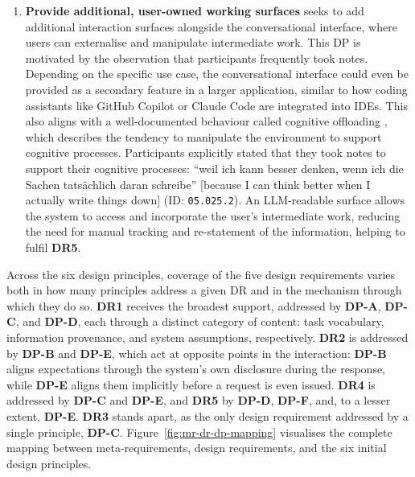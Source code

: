 \begin{enumerate}[label=\textbf{DP-\Alph*}, leftmargin=*]
    \item \textbf{Provide additional, user-owned working surfaces} seeks to add additional interaction surfaces alongside the conversational interface, where users can externalise and manipulate intermediate work. This \ac{DP} is motivated by the observation that participants frequently took notes. Depending on the specific use case, the conversational interface could even be provided as a secondary feature in a larger application, similar to how coding assistants like GitHub Copilot \parencite{GitHubInc2026} or Claude Code \parencite{AnthropicInc2026} are integrated into IDEs. This also aligns with a well-documented behaviour called cognitive offloading \parencite{Risko2016}, which describes the tendency to manipulate the environment to support cognitive processes. Participants explicitly stated that they took notes to support their cognitive processes: \enquote{weil ich kann besser denken, wenn ich die Sachen tatsächlich daran schreibe} [because I can think better when I actually write things down] (ID: \texttt{05.025.2}). An \ac{LLM}-readable surface allows the system to access and incorporate the user's intermediate work, reducing the need for manual tracking and re-statement of the information, helping to fulfil \textbf{DR5}.
\end{enumerate}

Across the six design principles, coverage of the five design requirements varies both in how many principles address a given \ac{DR} and in the mechanism through which they do so. \textbf{DR1} receives the broadest support, addressed by \textbf{DP-A}, \textbf{DP-C}, and \textbf{DP-D}, each through a distinct category of content: task vocabulary, information provenance, and system assumptions, respectively. \textbf{DR2} is addressed by \textbf{DP-B} and \textbf{DP-E}, which act at opposite points in the interaction: \textbf{DP-B} aligns expectations through the system's own disclosure during the response, while \textbf{DP-E} aligns them implicitly before a request is even issued. \textbf{DR4} is addressed by \textbf{DP-C} and \textbf{DP-E}, and \textbf{DR5} by \textbf{DP-D}, \textbf{DP-F}, and, to a lesser extent, \textbf{DP-E}. \textbf{DR3} stands apart, as the only design requirement addressed by a single principle, \textbf{DP-C}. Figure~\ref{fig:mr-dr-dp-mapping} visualises the complete mapping between meta-requirements, design requirements, and the six initial design principles.

